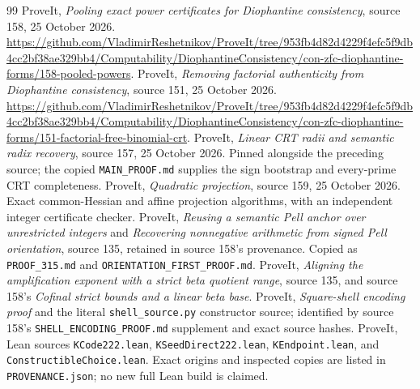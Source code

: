 \begingroup\small
\begin{thebibliography}{99}
 ProveIt, \emph{Pooling exact power certificates for
Diophantine consistency}, source 158, 25 October 2026.
\url{https://github.com/VladimirReshetnikov/ProveIt/tree/953fb4d82d4229f4efc5f9db4cc2bf38ae329bb4/Computability/DiophantineConsistency/con-zfc-diophantine-forms/158-pooled-powers}.
 ProveIt, \emph{Removing factorial authenticity from
Diophantine consistency}, source 151, 25 October 2026.
\url{https://github.com/VladimirReshetnikov/ProveIt/tree/953fb4d82d4229f4efc5f9db4cc2bf38ae329bb4/Computability/DiophantineConsistency/con-zfc-diophantine-forms/151-factorial-free-binomial-crt}.
 ProveIt, \emph{Linear CRT radii and semantic radix
recovery}, source 157, 25 October 2026. Pinned alongside the preceding source;
the copied \nolinkurl{MAIN_PROOF.md} supplies the sign bootstrap and
every-prime CRT completeness.
 ProveIt, \emph{Quadratic projection}, source 159,
25 October 2026. Exact common-Hessian and affine projection algorithms,
with an independent integer certificate checker.
 ProveIt, \emph{Reusing a semantic Pell anchor over
unrestricted integers} and \emph{Recovering nonnegative arithmetic from
signed Pell orientation}, source 135, retained in source 158's provenance.
Copied as \nolinkurl{PROOF_315.md} and \nolinkurl{ORIENTATION_FIRST_PROOF.md}.
 ProveIt, \emph{Aligning the amplification exponent
with a strict beta quotient range}, source 135, and source 158's
\emph{Cofinal strict bounds and a linear beta base}.
 ProveIt, \emph{Square-shell encoding proof} and the literal
\nolinkurl{shell_source.py} constructor source; identified by source 158's
\nolinkurl{SHELL_ENCODING_PROOF.md} supplement and exact source hashes.
 ProveIt, Lean sources \nolinkurl{KCode222.lean},
\nolinkurl{KSeedDirect222.lean}, \nolinkurl{KEndpoint.lean}, and
\nolinkurl{ConstructibleChoice.lean}. Exact origins and inspected copies are
listed in \nolinkurl{PROVENANCE.json}; no new full Lean build is claimed.
\end{thebibliography}
\endgroup
